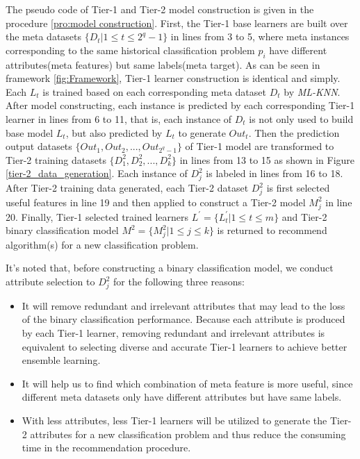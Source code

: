 \documentclass[review,3p,twocolumn,times]{elsarticle}
\begin{document}
The pseudo code of Tier-1 and Tier-2 model construction is given in the procedure \ref{pro:model construction}. First, the Tier-1 base learners are built over the meta datasets $\{D_t|1 \leq t \leq 2^q-1\}$ in lines from 3 to 5, where meta instances corresponding to the same historical classification problem $p_i$ have different attributes(meta features) but same labels(meta target). As can be seen in framework \ref{fig:Framework}, Tier-1 learner construction is identical and simply. Each $L_t$ is trained based on each corresponding meta dataset $D_t$ by \emph{ML-KNN}. After model constructing, each instance is predicted by each corresponding Tier-1 learner in lines from 6 to 11, that is, each instance of $D_t$ is not only used to build base model $L_t$, but also predicted by $L_t$ to generate $Out_t$. Then the prediction output datasets $\{Out_1,Out_2, ...,Out_{2^q-1}\}$ of Tier-1 model are transformed to Tier-2 training datasets $\{D^2_1, D^2_2, ..., D^2_k\}$ in lines from 13 to 15 as shown in Figure \ref{tier-2_data_generation}. Each instance of $D^2_j$ is labeled in lines from 16 to 18. After Tier-2 training data generated, each Tier-2 dataset $D^2_j$ is first selected useful features in line 19 and then applied to construct a Tier-2 model $M^2_j$ in line 20. Finally, Tier-1 selected trained learners $L^{'} = \{L_t^{'}|1 \leq t \leq m\}$ and Tier-2 binary classification model $M^2 =\{M^2_j|1 \leq j \leq k\}$ is returned to recommend algorithm(s) for a new classification problem.

It's noted that, before constructing a binary classification model, we conduct attribute selection to $D^2_j$ for the following three reasons:

\begin{itemize}
	\item It will remove redundant and irrelevant attributes that may lead to the loss of the binary classification performance. Because each attribute is produced by each Tier-1 learner, removing redundant and irrelevant attributes is equivalent to selecting diverse and accurate Tier-1 learners to achieve better ensemble learning. 
	
	\item It will help us to find which combination of meta feature is more useful, since different meta datasets only have different attributes but have same labels.
	
	\item With less attributes, less Tier-1 learners will be utilized to generate the Tier-2 attributes for a new classification problem and thus reduce the consuming time in the recommendation procedure.
\end{itemize}
\end{document}
